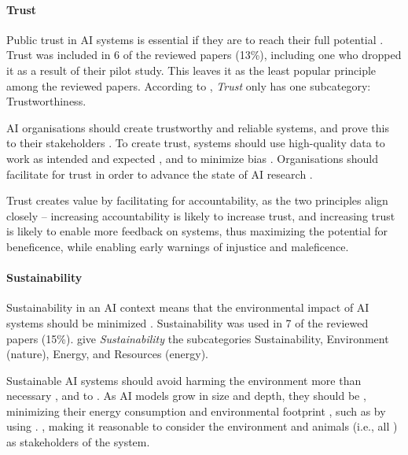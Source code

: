 \paragraph{Trust}
Public trust in AI systems is essential if they are to reach their full potential \parencite{Jobin_2019}. Trust was included in 6 of the reviewed papers (13\%), including one \parencite{Jakesch_2022} who dropped it as a result of their pilot study. This leaves it as the least popular principle among the reviewed papers. According to \textcite{Ryan_2021}, \textit{Trust} only has one subcategory: Trustworthiness.

AI organisations should create trustworthy and reliable systems, and prove this to their stakeholders \parencite{Ryan_2021}. To create trust, systems should use high-quality data to work as intended and expected \parencite{Ryan_2021}, and to minimize bias \parencite{WangY_2020}. Organisations should facilitate for trust  in order to advance the state of AI research \parencite{Jobin_2019}.

Trust creates value by facilitating for accountability, as the two principles align closely -- increasing accountability is likely to increase trust, and increasing trust is likely to enable more feedback on systems, thus maximizing the potential for beneficence, while enabling early warnings of injustice and maleficence.


\paragraph{Sustainability}
Sustainability in an AI context means that the environmental impact of AI systems should be minimized \parencite{Siala_2022}. Sustainability was used in 7 of the reviewed papers (15\%). \textcite{Ryan_2021} give \textit{Sustainability} the subcategories Sustainability, Environment (nature), Energy, and Resources (energy).

Sustainable AI systems should avoid harming the environment more than necessary \parencite{Mikalef_2022}, and to  \parencite[p.~97534]{Rizinski_2022}. As AI models grow in size and depth, they should be  \parencite[p.~75]{Ryan_2021}, minimizing their energy consumption and environmental footprint \parencite{Ryan_2021,Jobin_2019}, such as by using  \parencite{vanBruxvoort_2021}.  \parencite[p.~75]{Ryan_2021}, making it reasonable to consider the environment and animals (i.e., all  \parencite[p.~4]{Havrda_2020}) as stakeholders of the system.

